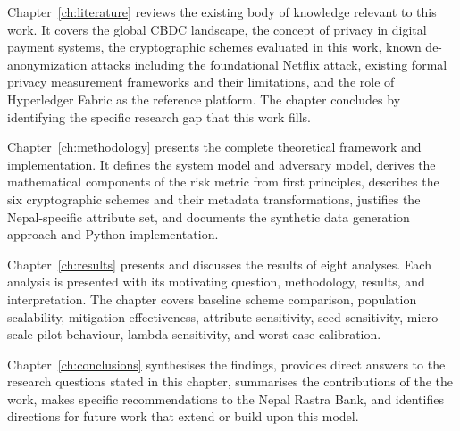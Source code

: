 Chapter~\ref{ch:literature} reviews the existing body of
knowledge relevant to this work. It covers the global
CBDC landscape, the concept of privacy in digital payment
systems, the cryptographic schemes evaluated in this work,
known de-anonymization attacks including the foundational
Netflix attack, existing formal privacy measurement
frameworks and their limitations, and the role of
Hyperledger Fabric as the reference platform. The chapter
concludes by identifying the specific research gap that
this work fills.

Chapter~\ref{ch:methodology} presents the complete
theoretical framework and implementation. It defines the
system model and adversary model, derives the mathematical
components of the risk metric from first principles,
describes the six cryptographic schemes and their metadata
transformations, justifies the Nepal-specific attribute
set, and documents the synthetic data generation approach
and Python implementation.

Chapter~\ref{ch:results} presents and discusses the
results of eight analyses. Each analysis is presented
with its motivating question, methodology, results, and
interpretation. The chapter covers baseline scheme
comparison, population scalability, mitigation
effectiveness, attribute sensitivity, seed sensitivity,
micro-scale pilot behaviour, lambda sensitivity, and
worst-case calibration.

Chapter~\ref{ch:conclusions} synthesises the findings,
provides direct answers to the research questions stated
in this chapter, summarises the contributions of the
the work, makes specific recommendations to the Nepal
Rastra Bank, and identifies directions for future work
that extend or build upon this model.